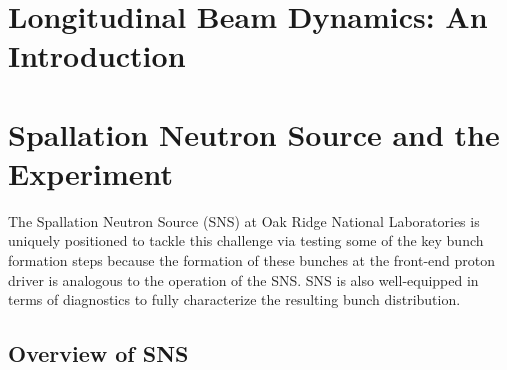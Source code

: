 \documentclass[12pt]{article}
\begin{document}
\section{Longitudinal Beam Dynamics: An Introduction}
\section{Spallation Neutron Source and the Experiment}
\par\noindent The Spallation Neutron Source (SNS) at Oak Ridge National Laboratories is uniquely positioned to tackle this challenge via testing some of the key bunch formation steps because the formation of these bunches at the front-end proton driver is analogous to the operation of the SNS. SNS is also well-equipped in terms of diagnostics to fully characterize the resulting bunch distribution. 
\subsection{Overview of SNS}
\end{document}
